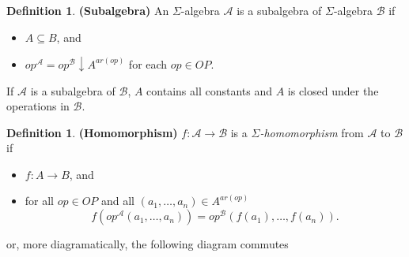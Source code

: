 \documentclass{amsart}
\theoremstyle{definition}
\newtheorem{definition}[thm]{Definition}
\newcommand{\ca}{\mathcal A} %
\newcommand{\cb}{\mathcal B} %
\begin{document}
\begin{definition}\textbf{(Subalgebra)} An $\Sigma$-algebra $\ca$ is a subalgebra of $\Sigma$-algebra $\cb$ if
\begin{itemize}
\item $A \subseteq B$, and
\item $op^\ca = op^\cb \downarrow A^{ar(op)}$ for each $op \in OP$.
\end{itemize}
\end{definition}

If $\ca$ is a subalgebra of $\cb$, $A$ contains all constants and $A$ is closed under the operations in $\cb$.

\begin{definition}\textbf{(Homomorphism)} $f : \ca \to \cb$ is a \textit{$\Sigma$-homomorphism} from $\ca$ to $\cb$ if
\begin{itemize}
\item $f : A \to B$, and 
\item for all $op \in OP$ and all $(a_1, \dots, a_n) \in A^{ar(op)}$
$$f(op^\ca(a_1, \dots, a_n)) = op^\cb(f(a_1), \dots, f(a_n)).$$
\end{itemize}
or, more diagramatically, the following diagram commutes

\begin{center}
\end{center}
\end{definition}
\end{document}
